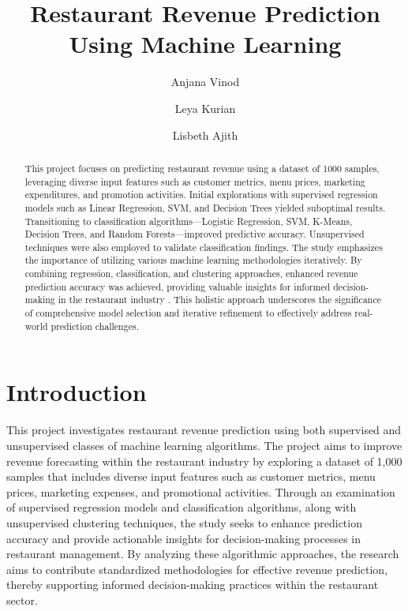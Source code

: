 \documentclass{josis}
\begin{document}


\title{Restaurant Revenue Prediction Using Machine Learning}

\author{Anjana Vinod}
\author{Leya Kurian }
\author{Lisbeth Ajith}
\date{}
\maketitle
\begin{abstract}
This project focuses on predicting restaurant revenue using a dataset of 1000 samples, leveraging diverse input features such as customer metrics, menu prices, marketing expenditures, and promotion activities. Initial explorations with supervised regression models such as Linear Regression, SVM, and Decision Trees yielded suboptimal results. Transitioning to classification algorithms—Logistic Regression, SVM, K-Means, Decision Trees, and Random Forests—improved predictive accuracy. Unsupervised techniques were also employed to validate classification findings. The study emphasizes the importance of utilizing various machine learning methodologies iteratively. By combining regression, classification, and clustering approaches, enhanced revenue prediction accuracy was achieved, providing valuable insights for informed decision-making in the restaurant industry \cite{ismail2023predicting}. This holistic approach underscores the significance of comprehensive model selection and iterative refinement to effectively address real-world prediction challenges.
\end{abstract}
\section{Introduction}
This project investigates restaurant revenue prediction using both supervised and unsupervised classes of machine learning algorithms. The project aims to improve revenue forecasting within the restaurant industry by exploring a dataset of 1,000 samples that includes diverse input features such as customer metrics, menu prices, marketing expenses, and promotional activities. Through an examination of supervised regression models and classification algorithms, along with unsupervised clustering techniques, the study seeks to enhance prediction accuracy and provide actionable insights for decision-making processes in restaurant management. By analyzing these algorithmic approaches, the research aims to contribute standardized methodologies for effective revenue prediction, thereby supporting informed decision-making practices within the restaurant sector.
\end{document}

